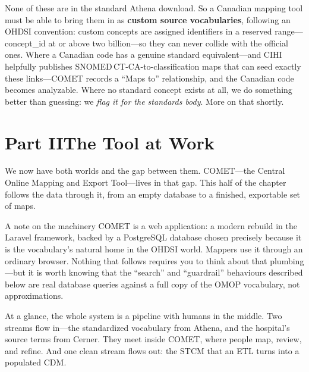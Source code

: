 \documentclass[12pt,openany]{book}
\newcommand{\code}[1]{{\ttfamily\small #1}}
\begin{document}
None of these are in the standard Athena download. So a Canadian mapping tool must be able to bring
them in as \textbf{custom source vocabularies}, following an OHDSI convention: custom concepts are
assigned identifiers in a reserved range---\code{concept\_id} at or above two billion---so they can
never collide with the official ones. Where a Canadian code has a genuine standard equivalent---and
CIHI helpfully publishes SNOMED\,CT-CA-to-classification maps that can seed exactly these
links---COMET records a ``Maps to'' relationship, and the Canadian code becomes analyzable. Where no
standard concept exists at all, we do something better than guessing: we \emph{flag it for the
standards body}. More on that shortly.

\clearpage
\section{Part II\quad The Tool at Work}

We now have both worlds and the gap between them. COMET---the Central Online Mapping and Export
Tool---lives in that gap. This half of the chapter follows the data through it, from an empty database
to a finished, exportable set of maps.

\begin{hood}{A note on the machinery}
COMET is a web application: a modern rebuild in the Laravel framework, backed by a PostgreSQL database
chosen precisely because it is the vocabulary's natural home in the OHDSI world. Mappers use it through
an ordinary browser. Nothing that follows requires you to think about that plumbing---but it is worth
knowing that the ``search'' and ``guardrail'' behaviours described below are real database queries
against a full copy of the OMOP vocabulary, not approximations.
\end{hood}

At a glance, the whole system is a pipeline with humans in the middle. Two streams flow in---the
standardized vocabulary from Athena, and the hospital's source terms from Cerner. They meet inside
COMET, where people map, review, and refine. And one clean stream flows out: the STCM that an ETL
turns into a populated CDM.
\end{document}
